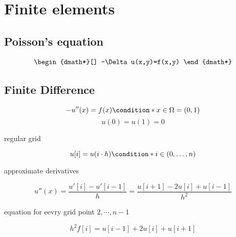 \chapter{Finite elements}
\section{Poisson's equation}
\begin{dgroup}[]
	\begin{dmath*}[]
		-\Delta u(x,y)=f(x,y)
	\end{dmath*}
\end{dgroup}
\section{Finite Difference}
\begin{expl}[1D problem]
	\begin{dmath}[]
		-u''(x)=f(x)\condition*{x\in \Omega=(0,1)}
	\end{dmath}
	\begin{dmath}[compact]
		u(0)=u(1)=0
	\end{dmath}
	\begin{dsuspend}
		regular grid
	\end{dsuspend}
	\begin{dmath}[]
		u[i]=u(i\cdot h)\condition*{i\in (0,\ldots,n)}
	\end{dmath}
	\begin{dsuspend}
		approximate derivatives
	\end{dsuspend}
	\begin{dmath}[]
		u''(x)=\frac{u'[i]-u'[i-1]}{h}=\frac{u[i+1]-2u[i]+u[i-1]}{h^2}
	\end{dmath}
	\begin{dsuspend}
		equation for eevry grid point $2,\cdots,n-1$
	\end{dsuspend}
	\begin{dmath}[]
		h^2 f[i]=u[i-1]+2 u[i]+u[i+1]
	\end{dmath}
\end{expl}
